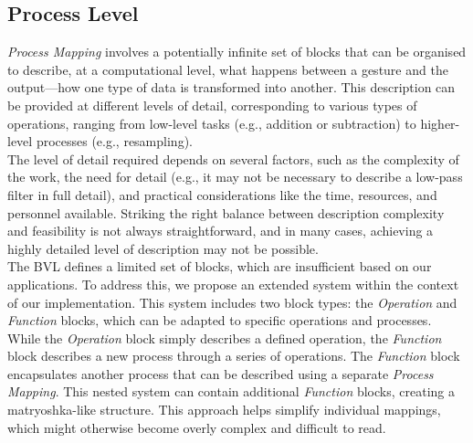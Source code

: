 \subsection{Process Level}
\textit{Process Mapping} involves a potentially infinite set of blocks that can be organised to describe, at a computational level, what happens between a gesture and the output—how one type of data is transformed into another. This description can be provided at different levels of detail, corresponding to various types of operations, ranging from low-level tasks (e.g., addition or subtraction) to higher-level processes (e.g., resampling).\\
The level of detail required depends on several factors, such as the complexity of the work, the need for detail (e.g., it may not be necessary to describe a low-pass filter in full detail), and practical considerations like the time, resources, and personnel available. Striking the right balance between description complexity and feasibility is not always straightforward, and in many cases, achieving a highly detailed level of description may not be possible.\\
The BVL defines a limited set of blocks, which are insufficient based on our applications. To address this, we propose an extended system within the context of our implementation. This system includes two block types: the \textit{Operation} and \textit{Function} blocks, which can be adapted to specific operations and processes.
While the \textit{Operation} block simply describes a defined operation, the \textit{Function} block describes a new process through a series of operations. The \textit{Function} block encapsulates another process that can be described using a separate \textit{Process Mapping}. This nested system can contain additional \textit{Function} blocks, creating a matryoshka-like structure. This approach helps simplify individual mappings, which might otherwise become overly complex and difficult to read.

